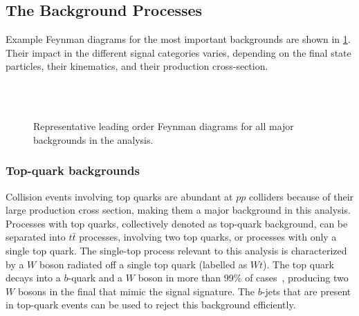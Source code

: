 \subsection{The Background Processes}
Example Feynman diagrams for the most important backgrounds are shown in \cref{fig:hww:feyn-bkgs}.
Their impact in the different signal categories varies, depending on the final state particles, their kinematics, and their production cross-section. 
\begin{figure}[ht]
     \hspace{5em}
     \\
     \hspace{5em}
     \\
     \hspace{5em}
    \caption{Representative leading order Feynman diagrams for all major backgrounds in the \HWW analysis.} 
    \label{fig:hww:feyn-bkgs}
\end{figure}

\subsubsection{Top-quark backgrounds}
Collision events involving top quarks are abundant at $pp$ colliders because of their large production cross section, making them a major background in this analysis.
Processes with top quarks, collectively denoted as top-quark background, can be separated into $t\bar{t}$ processes, involving two top quarks, or processes with only a single top quark. 
The single-top process relevant to this analysis is characterized by a $W$ boson radiated off a single top quark (labelled as $Wt$). 
The top quark decays into a $b$-quark and a $W$ boson in more than 99\% of cases~\cite{PDG2020}, producing two $W$ bosons in the final that mimic the signal signature. 
The $b$-jets that are present in top-quark events can be used to reject this background efficiently.

